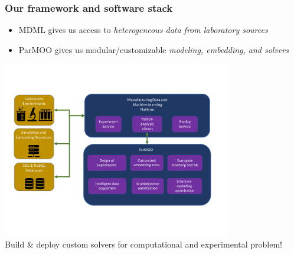 \documentclass[aspectratio=169]{beamer}
\begin{document}
\begin{frame}
\frametitle{Our framework and software stack}
  \begin{itemize}
  \item MDML gives us access to {\sl heterogeneous data from laboratory sources}
  \item ParMOO gives us modular/customizable {\sl modeling, embedding, and solvers}
  \end{itemize}

  \begin{center}

  \vskip -20pt

  \includegraphics[width=0.75\textwidth]{../../img/moo_new/mdml-parmoo-2.pdf}\\
  Build \& deploy custom solvers for computational and experimental problem!
  \end{center}
\end{frame}
\end{document}
